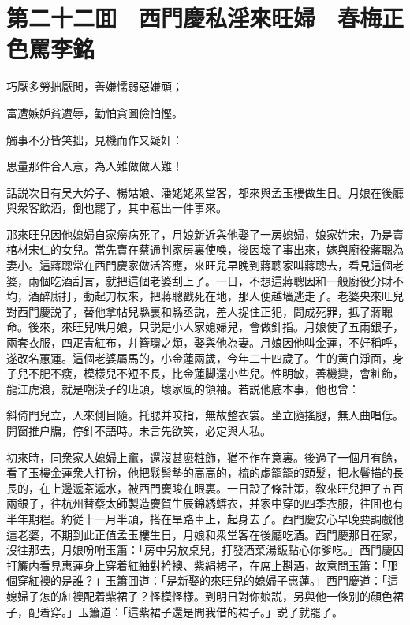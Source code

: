 
\chapter*{第二十二囬　西門慶私淫來旺婦　春梅正色罵李銘}

巧厭多勞拙厭閒，善嫌懦弱惡嫌頑；

富遭嫉妒貧遭辱，勤怕貪圖儉怕慳。

觸事不分皆笑拙，見機而作又疑奸：

思量那件合人意，為人難做做人難！

話説次日有吴大妗子、楊姑娘、潘姥姥衆堂客，都來與孟玉樓做生日。月娘在後廳與衆客飲酒，倒也罷了，其中惹出一件事來。

那來旺兒因他媳婦自家癆病死了，月娘新近與他娶了一房媳婦，娘家姓宋，乃是賣棺材宋仁的女兒。當先賣在蔡通判家房裏使喚，後因壞了事出來，嫁與廚役蔣聰為妻小。這蔣聰常在西門慶家做活答應，來旺兒早晚到蔣聰家叫蔣聰去，看見這個老婆，兩個吃酒刮言，就把這個老婆刮上了。一日，不想這蔣聰因和一般廚役分財不均，酒醉廝打，動起刀杖來，把蔣聰戳死在地，那人便越墙逃走了。老婆央來旺兒對西門慶説了，替他拿帖兒縣裏和縣丞説，差人捉住正犯，問成死罪，抵了蔣聰命。後來，來旺兒哄月娘，只説是小人家媳婦兒，會做針指。月娘使了五兩銀子，兩套衣服，四疋青紅布，幷簪環之類，娶與他為妻。月娘因他叫金蓮，不好稱呼，遂改名蕙蓮。這個老婆屬馬的，小金蓮兩歲，今年二十四歲了。生的黄白淨面，身子兒不肥不瘦，模樣兒不短不長，比金蓮脚還小些兒。性明敏，善機變，會粧飾，龍江虎浪，就是嘲漢子的班頭，壞家風的領袖。若説他底本事，他也曾：

斜倚門兒立，人來側目隨。托腮并咬指，無故整衣裳。坐立隨搖腿，無人曲唱低。開窗推户牖，停針不語時。未言先欲笑，必定與人私。

初來時，同衆家人媳婦上竃，還沒甚麽粧飾，猶不作在意裏。後過了一個月有餘，看了玉樓金蓮衆人打扮，他把䯼髻墊的高高的，梳的虚籠籠的頭髮，把水鬢描的長長的，在上邊遞茶遞水，被西門慶睃在眼裏。一日設了條計策，敎來旺兒押了五百兩銀子，往杭州替蔡太師製造慶賀生辰錦綉蟒衣，并家中穿的四季衣服，往囬也有半年期程。約従十一月半頭，搭在旱路車上，起身去了。西門慶安心早晚要調戲他這老婆，不期到此正值孟玉樓生日，月娘和衆堂客在後廳吃酒。西門慶那日在家，沒往那去，月娘吩咐玉簫：「房中另放桌兒，打發酒菜湯飯點心你爹吃。」西門慶因打簾内看見惠蓮身上穿着紅紬對衿襖、紫絹裙子，在席上斟酒，故意問玉簫：「那個穿紅襖的是誰？」玉簫囬道：「是新娶的來旺兒的媳婦子惠蓮。」西門慶道：「這媳婦子怎的紅襖配着紫裙子？怪模怪樣。到明日對你娘説，另與他一條别的顔色裙子，配着穿。」玉簫道：「這紫裙子還是問我借的裙子。」説了就罷了。

